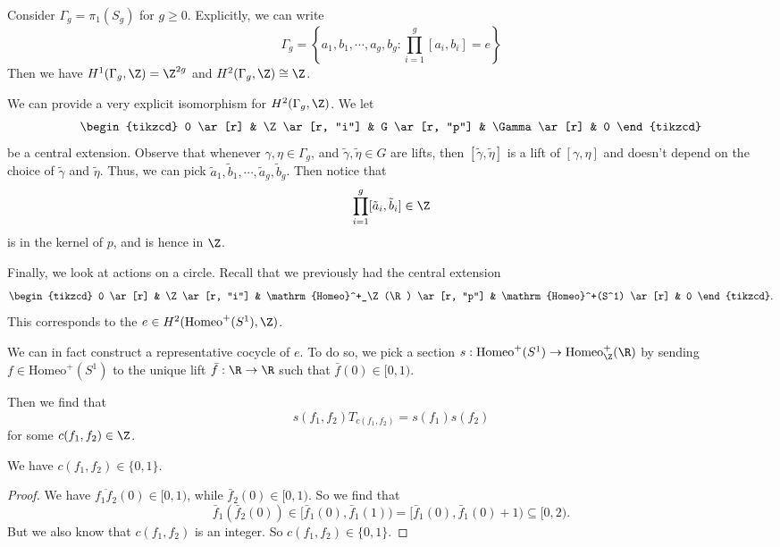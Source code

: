 \documentclass[a4paper]{article}
\newcommand\Homeo{\mathrm{Homeo}}
\begin{document}
\begin{eg}
  Consider $\Gamma_g = \pi_1(S_g)$ for $g \geq 0$. Explicitly, we can write
  \[
    \Gamma_g = \left\{a_1, b_1, \cdots, a_g, b_g : \prod_{i = 1}^g [a_i, b_i] = e\right\}
  \]
  Then we have $H^1(\Gamma_g, \Z) = \Z^{2g}$ and $H^2(\Gamma_g, \Z) \cong \Z$.

  We can provide a very explicit isomorphism for $H^2(\Gamma_g, \Z)$. We let
  \[
    \begin{tikzcd}
      0 \ar[r] & \Z \ar[r, "i"] & G \ar[r, "p"] & \Gamma \ar[r] & 0
    \end{tikzcd}
  \]
  be a central extension. Observe that whenever $\gamma, \eta \in \Gamma_g$, and $\tilde{\gamma}, \tilde{\eta} \in G$ are lifts, then $[\tilde{\gamma}, \tilde{\eta}]$ is a lift of $[\gamma, \eta]$ and doesn't depend on the choice of $\tilde{\gamma}$ and $\tilde{\eta}$. Thus, we can pick $\tilde{a}_1, \tilde{b}_1, \cdots, \tilde{a}_g, \tilde{b}_g$. Then notice that
  \[
    \prod_{i = 1}^g [\tilde{a}_i, \tilde{b}_i] \in \Z
  \]
  is in the kernel of $p$, and is hence in $\Z$.
\end{eg}

Finally, we look at actions on a circle. Recall that we previously had the central extension
\[
  \begin{tikzcd}
    0 \ar[r] & \Z \ar[r, "i"] & \Homeo^+_\Z(\R) \ar[r, "p"] & \Homeo^+(S^1) \ar[r] & 0
  \end{tikzcd}.
\]
This corresponds to the  $e \in H^2(\Homeo^+(S^1), \Z)$.

We can in fact construct a representative cocycle of $e$. To do so, we pick a section $s: \Homeo^+(S^1) \to \Homeo_\Z^+(\R)$ by sending $f \in \Homeo^+(S^1)$ to the unique lift $\bar{f}: \R \to \R$ such that $\bar{f}(0) \in [0, 1)$.

Then we find that
\[
  s(f_1, f_2) T_{c(f_1, f_2)} = s(f_1) s(f_2)
\]
for some $c(f_1, f_2) \in \Z$.

\begin{lemma}
  We have $c(f_1, f_2) \in \{0, 1\}$.
\end{lemma}

\begin{proof}
  We have $\overline{f_1 f_2}(0) \in [0, 1)$, while $\bar{f}_2(0) \in [0, 1)$. So we find that
  \[
    \bar{f}_1(\bar{f}_2(0)) \in [\bar{f}_1(0), \bar{f}_1(1)) = [\bar{f}_1(0), \bar{f}_1(0) + 1) \subseteq [0, 2).
  \]
  But we also know that $c(f_1, f_2)$ is an integer. So $c(f_1, f_2) \in \{0, 1\}$.
\end{proof}
\end{document}
